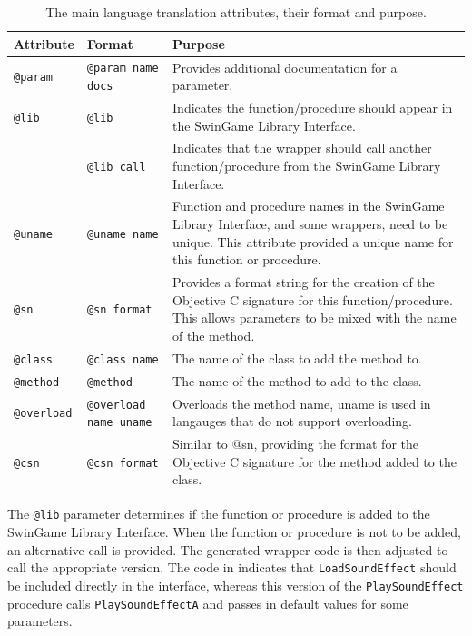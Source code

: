 \begin{table}[hbp]
    \footnotesize
    \centering
    \caption{The main language translation attributes, their format and purpose.}
    \label{tbl:attributes}
    \begin{tabular}{l|l|p{8cm}}
    Attribute & Format & Purpose \\
    \hline
    \texttt{@param} & \texttt{@param name docs} & Provides additional documentation for a parameter. \\
    \texttt{@lib} & \texttt{@lib} & Indicates the function/procedure should appear in the SwinGame Library Interface. \\
    ~ & \texttt{@lib call} & Indicates that the wrapper should call another function/procedure from the SwinGame Library Interface. \\
    \texttt{@uname} & \texttt{@uname name} & Function and procedure names in the SwinGame Library Interface, and some wrappers, need to be unique. This attribute provided a unique name for this function or procedure. \\
    \texttt{@sn} & \texttt{@sn format} & Provides a format string for the creation of the Objective C signature for this function/procedure. This allows parameters to be mixed with the name of the method. \\
    \texttt{@class} & \texttt{@class name} & The name of the class to add the method to. \\
    \texttt{@method} & \texttt{@method} & The name of the method to add to the class. \\
    \texttt{@overload} & \texttt{@overload name uname} & Overloads the method name, uname is used in langauges that do not support overloading. \\
    \texttt{@csn} & \texttt{@csn format} & Similar to @sn, providing the format for the Objective C signature for the method added to the class. \\
    \end{tabular}
\end{table}

The \texttt{@lib} parameter determines if the function or procedure is added to the SwinGame Library Interface. When the function or procedure is not to be added, an alternative call is provided. The generated wrapper code is then adjusted to call the appropriate version. The code in  indicates that \texttt{LoadSoundEffect} should be included directly in the interface, whereas this version of the \texttt{PlaySoundEffect} procedure calls \texttt{PlaySoundEffectA} and passes in default values for some parameters.

